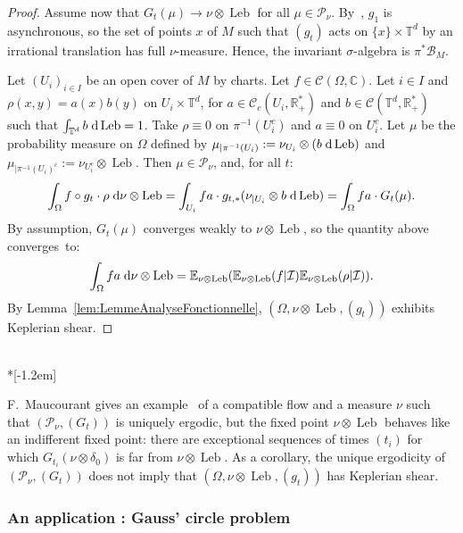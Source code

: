\documentclass[AHL,Unicode,longabstracts]{cedram}
\DeclareMathOperator{\Leb}{Leb}
\newcommand{\R}{\mathbb{R}}
\newcommand{\Cbb}{\mathbb{C}}
\newcommand{\Ebb}{\mathbb{E}}
\newcommand{\Tbb}{\mathbb{T}}
\newcommand{\Bcal}{\mathcal{B}}
\newcommand{\Ccal}{\mathcal{C}}
\newcommand{\Ical}{\mathcal{I}}
\newcommand{\Pcal}{\mathcal{P}}
\newcommand{\dd}{\;{\rm d}}
\begin{document}
\begin{proof}

Assume now that $G_t (\mu) \to \nu \otimes \Leb$ for all $\mu \in \Pcal_\nu$. By~\cite[Theorem~1]{Maucourant:2016}, $g_1$ is asynchronous, so the set of points $x$ of $M$ such that $(g_t)$ acts on $\{x\} \times \Tbb^d$ by an irrational translation has full $\nu$-measure. Hence, the invariant $\sigma$-algebra is $\pi^* \Bcal_M$.


Let $(U_i)_{i \in I}$ be an open cover of $M$ by charts. Let $f \in \Ccal (\Omega, \Cbb)$. Let $i \in I$ and $\rho (x,y) = a(x) b(y)$ on $U_i \times \Tbb^d$, for $a \in \Ccal_c (U_i, \R_+^*)$ and $b \in \Ccal (\Tbb^d, \R_+^*)$ such that $\int_{\Tbb^d} b \dd \Leb = 1$. Take $\rho \equiv 0$ on $\pi^{-1}(U_i^c)$ and $a \equiv 0$ on $U_i^c$. Let $\mu$ be the probability measure on $\Omega$ defined by $\mu_{|\pi^{-1}(U_i)} := \nu_{U_i} \otimes (b \dd \Leb)$ and $\mu_{|\pi^{-1}(U_i)^c} := \nu_{U_i^c} \otimes \Leb$. Then $\mu \in \Pcal_\nu$, and, for all $t$:
\[
\int_\Omega f \circ g_t \cdot \rho \dd \nu \otimes \Leb = \int_{U_i} fa \cdot g_{t,*} (\nu_{|U_i} \otimes b \dd \Leb) = \int_\Omega fa \cdot G_t (\mu).
\]
By assumption, $G_t (\mu)$ converges weakly to $\nu \otimes \Leb$, so the quantity above converges~to:
\[
\int_\Omega fa \dd \nu \otimes \Leb = \Ebb_{\nu \otimes \Leb} (\Ebb_{\nu \otimes \Leb} (f|\Ical) \Ebb_{\nu \otimes \Leb} (\rho|\Ical)).
\]
By Lemma~\ref{lem:LemmeAnalyseFonctionnelle}, $(\Omega, \nu \otimes \Leb, (g_t))$ exhibits Keplerian shear.
\end{proof}


\begin{rema}\ \\*[-1.2em]

F.~Maucourant gives an example~\cite{Maucourant:2016} of a compatible flow and a measure $\nu$ such that $(\Pcal_\nu, (G_t))$ is uniquely ergodic, but the fixed point $\nu \otimes \Leb$ behaves like an indifferent fixed point: there are exceptional sequences of times $(t_i)$ for which $G_{t_i} (\nu \otimes \delta_0)$ is far from $\nu \otimes \Leb$. As a corollary, the unique ergodicity of $(\Pcal_\nu, (G_t))$ does not imply that $(\Omega, \nu \otimes \Leb, (g_t))$ has Keplerian shear.
\end{rema}


\subsubsection{An application : Gauss' circle problem}\label{subsubsec:Gauss}
\end{document}
